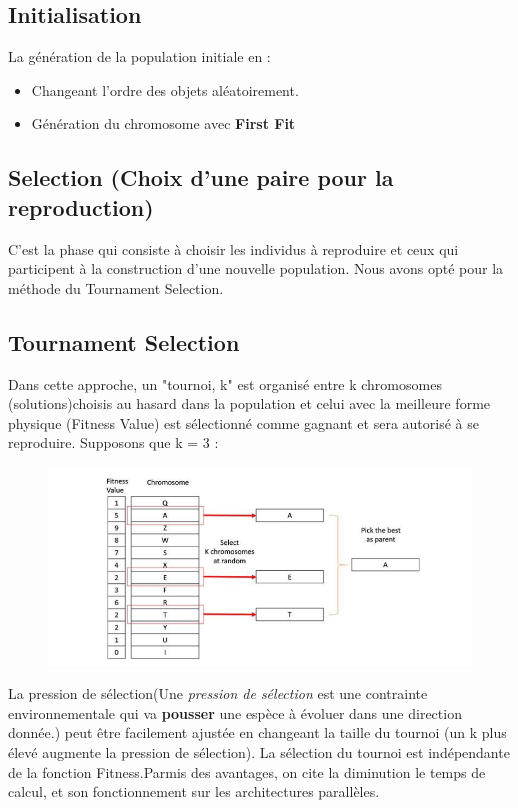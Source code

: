 \documentclass{article}
\begin{document}
\subsection{Initialisation}
La génération de la population initiale en :
		\begin{itemize}
			\item Changeant l’ordre des objets aléatoirement.
			\item Génération du chromosome avec \textbf{First Fit}
		\end{itemize}
\subsection{Selection (Choix d'une paire pour la reproduction)}
C’est la phase qui consiste à choisir les individus à reproduire et ceux qui participent à la construction d’une nouvelle population. Nous avons opté pour la méthode du Tournament Selection.
\subsection{Tournament Selection}
Dans cette approche, un "tournoi, k" est organisé entre k chromosomes (solutions)choisis au hasard dans la population et celui avec la meilleure forme physique (Fitness Value) est sélectionné comme gagnant et sera autorisé à se reproduire.
\newline
Supposons que k = 3 :
\begin{figure}[H]
  \includegraphics[width=\linewidth]{../figures/pic04.PNG}
\end{figure}
La pression de sélection(Une \textit{pression de sélection} est une contrainte environnementale qui va \textbf{pousser} une espèce à évoluer dans une direction donnée.) peut être facilement ajustée en changeant la taille du tournoi (un k plus élevé augmente la pression de sélection).
La sélection du tournoi est indépendante de la fonction Fitness.Parmis des avantages, on cite la diminution le temps de calcul, et son fonctionnement sur les architectures parallèles.
\end{document}
